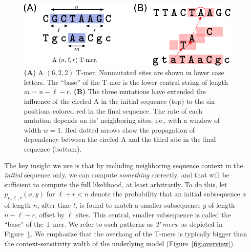\documentclass{article}
\newcommand{\nA}{\mbox{A}}  %
\theoremstyle{plain}
\theoremstyle{definition}
\begin{document}
\begin{figure}
    \begin{center}
        \includegraphics{Tmer-dependency}
    \end{center}
    \caption{
        \textbf{(A)} A $(6,2,2)$ T-mer.
        Nonmutated sites are shown in lower case letters.
        The ``base'' of the T-mer is the lower central
        string of length $m = n - \ell - r$.
        \textbf{(B)}
        The three mutations have extended the influence of the circled \nA{}
        in the initial sequence (top)
        to the six positions colored red in the final sequence.
        The rate of each mutation depends on its' neighboring sites,
        i.e., with a window of width $w=1$.
        Red dotted arrows show the propagation of dependency
        between the circled \nA{}
        and the third site in the final sequence (bottom).
        \label{fig:Tmers}
    }
\end{figure}



The key insight we use is that by including neighboring sequence context in the \emph{initial} sequence only,
we can compute \emph{something} correctly,
and that will be sufficient to compute the full likelihood,
at least arbitrarily.
To do this, let $p_{n,\ell,r}(x,y)$ for $\ell + r < n$ denote
the probability that an initial subsequence $x$ of length $n$, after time $t$,
is found to match a smaller subsequence $y$ of length $n-\ell-r$, offset by $\ell$ sites.
This central, smaller subsequence is called the ``base'' of the T-mer.
We refer to such patterns as \emph{T-mers}, as depicted in Figure~\ref{fig:Tmers}.
We emphasize that the overhang of the T-mers is typically bigger than the
context-sensitivity width of the underlying model (Figure~\ref{fig:overview}).
\end{document}
